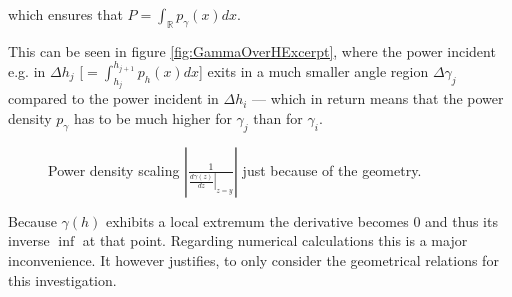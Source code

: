 \documentclass[pagesize=pdftex,paper=a4,fontsize=12pt]{scrartcl}
\newcommand{\abs}[1]{\ensuremath{\left|{#1}\right|}}
\newcommand{\R}{\mathbb{R}}
\begin{document}
which ensures that $P = \int_{\R} p_{\gamma} (x) dx$.

This can be seen in figure \ref{fig:GammaOverHExcerpt}, where the power incident e.g. in $\Delta h_{j}$ [$= \int_{h_j}^{h_{j+1}} p_h (x) dx$] exits in a much smaller angle region $\Delta \gamma_{j}$ compared to the power incident in $\Delta h_{i}$ --- which in return means that the power density $p_\gamma$ has to be much higher for $\gamma_j$ than for $\gamma_i$.

\begin{figure}[H]
	\centering
	\caption{Power density scaling $\abs{\frac{1}{\displaystyle \left.\frac{d\gamma (z)}{dz}\right|_{z=y}}}$ just because of the geometry.}
	\label{fig:invdGammadHOverHExcerpt}
\end{figure}

Because $\gamma (h)$ exhibits a local extremum the derivative becomes $0$ and thus its inverse $\inf$ at that point. Regarding numerical calculations this is a major inconvenience. It however justifies, to only consider the geometrical relations for this investigation.
\end{document}
